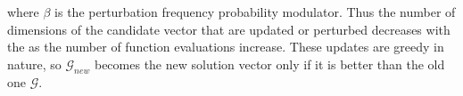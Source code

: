 \documentclass[12pt]{article}
\begin{document}
where $\beta$ is the perturbation frequency probability modulator. Thus the number of dimensions of the candidate vector that are updated or perturbed decreases with the as the number of function evaluations increase. These updates are greedy in nature, so $\mathcal{G}_{new}$ becomes the new solution vector only if it is better than the old one $\mathcal{G}$.  

\end{document}
